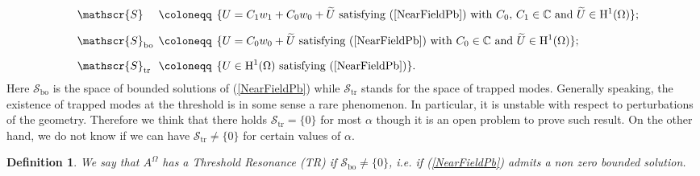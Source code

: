 \documentclass[11pt,a4paper]{article}
\newcommand{\dsp}{\displaystyle}
\newcommand{\Om}{\Omega}
\newcommand{\mrm}[1]{\mathrm{#1}}
\newcommand{\Cplx}{\mathbb{C}}
\newcommand{\mH}{\mrm{H}}
\newcommand{\mX}{\mathscr{S}}
\newtheorem{definition}[theorem]{Definition}
\begin{document}
\begin{equation}\label{DefSpaceX}
\begin{array}{lcl}
\mX&\hspace{-0.2cm}\coloneqq&\hspace{-0.2cm}\dsp\{U=C_1 w_1+C_0 w_0+\widetilde{U}\mbox{ satisfying  }(\ref{NearFieldPb})\mbox{ with }C_0,\,C_1\in\Cplx\mbox{ and }\widetilde{U}\in\mH^1(\Om)\};\\[10pt]
\mX_{\mrm{bo}}&\hspace{-0.2cm}\coloneqq&\hspace{-0.2cm}\dsp\{U= C_0 w_0+\widetilde{U}\mbox{ satisfying  }(\ref{NearFieldPb})\mbox{ with }C_0\in\Cplx\mbox{ and }\widetilde{U}\in\mH^1(\Om)\};\\[10pt]
\mX_{\mrm{tr}}&\hspace{-0.2cm}\coloneqq&\hspace{-0.2cm}\dsp\{U\in\mH^1(\Om)\mbox{ satisfying  }(\ref{NearFieldPb})\}.
\end{array}\hspace{-0.3cm}
\end{equation}
Here $\mX_{\mrm{bo}}$ is the space of bounded solutions of (\ref{NearFieldPb}) while $\mX_{\mrm{tr}}$ stands for the space of trapped modes. Generally speaking, the existence of trapped modes at the threshold is in some sense a rare phenomenon. In particular, it is unstable with respect to perturbations of the geometry. Therefore we think that there holds  $\mX_{\mrm{tr}}=\{0\}$ for most $\alpha$ though it is an open problem to prove such result. On the other hand, we do not know if we can have $\mX_{\mrm{tr}}\ne\{0\}$ for certain values of $\alpha$.

\begin{definition}\label{DefTR}
We say that $A^{\Om}$ has a Threshold Resonance (TR) if $\mX_{\mrm{bo}}\ne\{0\}$, i.e. if (\ref{NearFieldPb}) admits a non zero bounded solution.
\end{definition}
\end{document}
